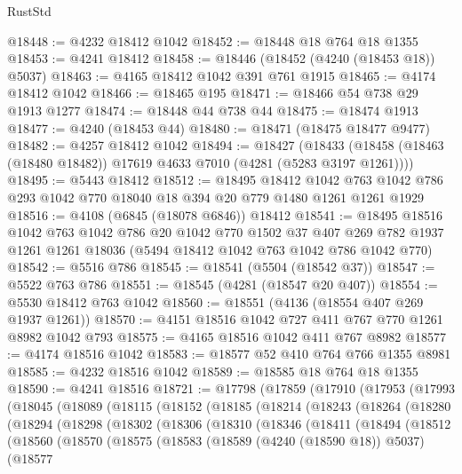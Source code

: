 \begin{lexlean}{RustStd}
\begin{coremodule}
{\begin{coremodule}
{{{{{{{{{{{{{{{{{{{{{{{{{{{{{{{{{{{@18448 := @4232 @18412 @1042
@18452 := @18448 @18 @764 @18 @1355
@18453 := @4241 @18412
@18458 := @18446 (@18452 (@4240 (@18453 @18)) @5037)
@18463 := @4165 @18412 @1042 @391 @761 @1915
@18465 := @4174 @18412 @1042
@18466 := @18465 @195
@18471 := @18466 @54 @738 @29 @1913 @1277
@18474 := @18448 @44 @738 @44
@18475 := @18474 @1913
@18477 := @4240 (@18453 @44)
@18480 := @18471 (@18475 @18477 @9477)
@18482 := @4257 @18412 @1042
@18494 := @18427
    (@18433 (@18458 (@18463 (@18480 @18482)) @17619 @4633 @7010 (@4281 (@5283 @3197 @1261))))
@18495 := @5443 @18412
@18512 := @18495
    @18412
    @1042
    @763
    @1042
    @786
    @293
    @1042
    @770
    @18040
    @18
    @394
    @20
    @779
    @1480
    @1261
    @1261
    @1929
@18516 := @4108 (@6845 (@18078 @6846)) @18412
@18541 := @18495
    @18516
    @1042
    @763
    @1042
    @786
    @20
    @1042
    @770
    @1502
    @37
    @407
    @269
    @782
    @1937
    @1261
    @1261
    @18036
    (@5494 @18412 @1042 @763 @1042 @786 @1042 @770)
@18542 := @5516 @786
@18545 := @18541 (@5504 (@18542 @37))
@18547 := @5522 @763 @786
@18551 := @18545 (@4281 (@18547 @20 @407))
@18554 := @5530 @18412 @763 @1042
@18560 := @18551 (@4136 (@18554 @407 @269 @1937 @1261))
@18570 := @4151 @18516 @1042 @727 @411 @767 @770 @1261 @8982 @1042 @793
@18575 := @4165 @18516 @1042 @411 @767 @8982
@18577 := @4174 @18516 @1042
@18583 := @18577 @52 @410 @764 @766 @1355 @8981
@18585 := @4232 @18516 @1042
@18589 := @18585 @18 @764 @18 @1355
@18590 := @4241 @18516
@18721 := @17798
    (@17859
      (@17910
        (@17953
          (@17993
            (@18045
              (@18089
                (@18115
                  (@18152
                    (@18185
                      (@18214
                        (@18243
                          (@18264
                            (@18280
                              (@18294
                                (@18298
                                  (@18302
                                    (@18306
                                      (@18310
                                        (@18346
                                          (@18411
                                            (@18494
                                              (@18512
                                                (@18560
                                                  (@18570
                                                    (@18575
                                                      (@18583
                                                        (@18589 (@4240 (@18590 @18)) @5037)
                                                        (@18577
}}}}}}}}}}}}}}}}}}}}}}}}}}}}}}}}}}}
\end{coremodule}}
\end{coremodule}
\end{lexlean}
